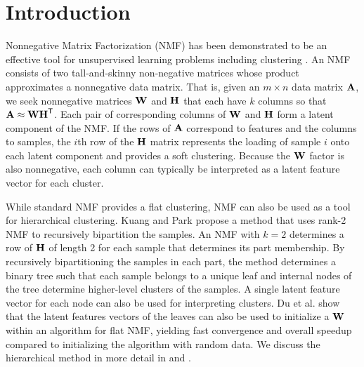 \documentclass[conference,compsoc]{IEEEtran}
\begin{document}

\section{Introduction}

Nonnegative Matrix Factorization (NMF) has been demonstrated to be an effective tool for unsupervised learning problems including clustering \cite{XLG03, SBPP06, DHS05}. 
An NMF consists of two tall-and-skinny non-negative matrices whose product approximates a nonnegative data matrix.
That is, given an $m\times n$ data matrix $\M{A}$, we seek nonnegative matrices $\M{W}$ and $\M{H}$ that each have $k$ columns so that $\M{A} \approx \M{W}\M{H}^\Tra$.
Each pair of corresponding columns of $\M{W}$ and $\M{H}$ form a latent component of the NMF.
If the rows of $\M{A}$ correspond to features and the columns to samples, the $i$th row of the $\M{H}$ matrix represents the loading of sample $i$ onto each latent component and provides a soft clustering.
Because the $\M{W}$ factor is also nonnegative, each column can typically be interpreted as a latent feature vector for each cluster.

While standard NMF provides a flat clustering, NMF can also be used as a tool for hierarchical clustering.
Kuang and Park \cite{KP13} propose a method that uses rank-2 NMF to recursively bipartition the samples.
An NMF with $k=2$ determines a row of $\M{H}$ of length 2 for each sample that determines its part membership.
By recursively bipartitioning the samples in each part, the method determines a binary tree such that each sample belongs to a unique leaf and internal nodes of the tree determine higher-level clusters of the samples.
A single latent feature vector for each node can also be used for interpreting clusters.
Du et al. \cite{DKDP17} show that the latent features vectors of the leaves can also be used to initialize a $\M{W}$ within an algorithm for flat NMF, yielding fast convergence and overall speedup compared to initializing the algorithm with random data.
We discuss the hierarchical method in more detail in  and .
\end{document}
